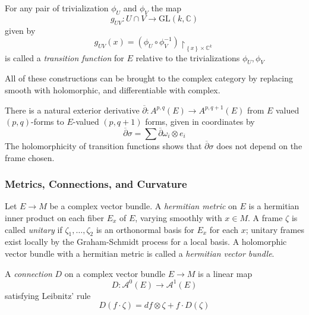\begin{defn}
	For any pair of trivialization $ \phi_U$ and $ \phi_V$ the map
	\[
		g_{UV}: U \cap V \to \mathrm{GL}(k, \mathbb{C})
	\]
	given by 
	\[
		g_{UV}(x) = \left( \phi_U \circ \phi_V^{-1} \right) \restriction_{ \left\{ x \right\} \times \mathbb{C}^k }
	\]
	is called a \textit{transition function} for $E$ relative to the trivializations $ \phi_U, \phi_V$
\end{defn}

All of these constructions can be brought to the complex category by replacing smooth with holomorphic, and differentiable with complex.

\begin{prop}
	There is a natural exterior derivative $ \overline{\partial}: A^{p,q}(E) \to A^{p,q+1}(E)$ from $E$ valued $(p,q)$-forms to $E$-valued $(p, q+1)$ forms, given in coordinates by 
	\[
	\overline{\partial} \sigma = \sum \overline{\partial}\omega_i \otimes e_i
	\]
	The holomorphicity of transition functions shows that $ \overline{\partial}\sigma$ does not depend on the frame chosen.	
\end{prop}

\subsubsection{Metrics, Connections, and Curvature}
\begin{defn}


Let $ E \to M$ be a complex vector bundle. A \textit{hermitian metric} on $E$ is a hermitian inner product on each fiber $E_x$ of $E$, varying smoothly with $ x \in M$. A frame $\zeta$ is called \textit{unitary} if $ \zeta_1, \ldots, \zeta_2$ is an orthonormal basis for $E_x$ for each $x$; unitary frames exist locally by the Graham-Schmidt process for a local basis. A holomorphic vector bundle with a hermitian metric is called a \textit{hermitian vector bundle}.

\end{defn}

\begin{defn}

A \textit{connection} $D$ on a complex vector bundle $E \to M$ is a linear map
\[
	D: \mathcal{A}^0 (E) \to \mathcal{A}^1(E)
\]
satisfying Leibnitz' rule
\[
	D(f \cdot \zeta) = df \otimes \zeta + f \cdot D( \zeta )
\]


\end{defn}

























